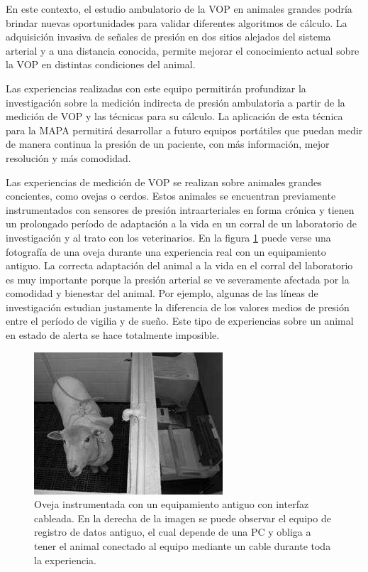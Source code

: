 En este contexto, el estudio ambulatorio de la VOP en animales grandes podría brindar nuevas oportunidades para validar diferentes algoritmos de cálculo. La adquisición invasiva de señales de presión en dos sitios alejados del sistema arterial y a una distancia conocida, permite mejorar el conocimiento actual sobre la VOP en distintas condiciones del animal.

Las experiencias realizadas con este equipo permitirán profundizar la investigación sobre la medición indirecta de presión ambulatoria a partir de la medición de VOP y las técnicas para su cálculo. La aplicación de esta técnica para la MAPA permitirá desarrollar a futuro equipos portátiles que puedan medir de manera continua la presión de un paciente, con más información, mejor resolución y más comodidad.

Las experiencias de medición de VOP se realizan sobre animales grandes concientes, como ovejas o cerdos. Estos animales se encuentran previamente instrumentados con sensores de presión intraarteriales en forma crónica y tienen un prolongado período de adaptación a la vida en un corral de un laboratorio de investigación y al trato con los veterinarios. En la figura \ref{fig:oveja} puede verse una fotografía de una oveja durante una experiencia real con un equipamiento antiguo. La correcta adaptación del animal a la vida en el corral del laboratorio es muy importante porque la presión arterial se ve severamente afectada por la comodidad y bienestar del animal. Por ejemplo, algunas de las líneas de investigación estudian justamente la diferencia de los valores medios de presión entre el período de vigilia y de sueño. Este tipo de experiencias sobre un animal en estado de alerta se hace totalmente imposible.


\begin{figure}[!htbp]
	\centering
	\includegraphics[width=\textwidth]{./Figures/oveja.png}
	\caption{Oveja instrumentada con un equipamiento antiguo con interfaz cableada. En la derecha de la imagen se puede observar el equipo de registro de datos antiguo, el cual depende de una PC y obliga a tener el animal conectado al equipo mediante un cable durante toda la experiencia.}
	\label{fig:oveja}
\end{figure}

